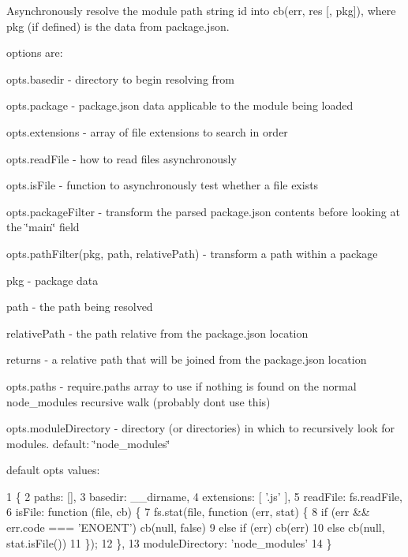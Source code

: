 Asynchronously resolve the module path string {\ttfamily id} into {\ttfamily cb(err, res \mbox{[}, pkg\mbox{]})}, where {\ttfamily pkg} (if defined) is the data from {\ttfamily package.\+json}.

options are\+:


\begin{DoxyItemize}
\item opts.\+basedir -\/ directory to begin resolving from
\item opts.\+package -\/ {\ttfamily package.\+json} data applicable to the module being loaded
\item opts.\+extensions -\/ array of file extensions to search in order
\item opts.\+read\+File -\/ how to read files asynchronously
\item opts.\+is\+File -\/ function to asynchronously test whether a file exists
\item opts.\+package\+Filter -\/ transform the parsed package.\+json contents before looking at the \char`\"{}main\char`\"{} field
\item opts.\+path\+Filter(pkg, path, relative\+Path) -\/ transform a path within a package
\begin{DoxyItemize}
\item pkg -\/ package data
\item path -\/ the path being resolved
\item relative\+Path -\/ the path relative from the package.\+json location
\item returns -\/ a relative path that will be joined from the package.\+json location
\end{DoxyItemize}
\item opts.\+paths -\/ require.\+paths array to use if nothing is found on the normal node\+\_\+modules recursive walk (probably don\textquotesingle{}t use this)
\item opts.\+module\+Directory -\/ directory (or directories) in which to recursively look for modules. default\+: {\ttfamily \char`\"{}node\+\_\+modules\char`\"{}}
\end{DoxyItemize}

default {\ttfamily opts} values\+:


\begin{DoxyCode}
1 \{
2     paths: [],
3     basedir: \_\_dirname,
4     extensions: [ '.js' ],
5     readFile: fs.readFile,
6     isFile: function (file, cb) \{
7         fs.stat(file, function (err, stat) \{
8             if (err && err.code === 'ENOENT') cb(null, false)
9             else if (err) cb(err)
10             else cb(null, stat.isFile())
11         \});
12     \},
13     moduleDirectory: 'node\_modules'
14 \}
\end{DoxyCode}



